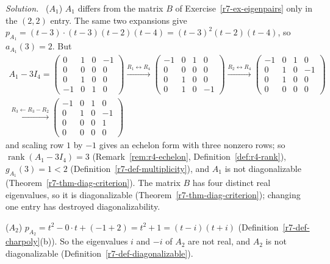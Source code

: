 \documentclass[12pt]{article}
\DeclareMathOperator{\rank}{rank}
\theoremstyle{definition}
\newenvironment{solution}{\par\noindent\textit{Solution.}\ }{\par\smallskip}
\begin{document}
\begin{solution}
(\(A_1\)) \(A_1\) differs from the matrix \(B\) of Exercise~\ref{r7-ex-eigenpairs} only in the \((2,2)\) entry. The same
two expansions give \(p_{A_1}=(t-3)\cdot(t-3)(t-2)(t-4)=(t-3)^2(t-2)(t-4)\), so \(a_{A_1}(3)=2\). But
\[
\begin{gathered}
A_1-3I_4=\begin{pmatrix}0&1&0&-1\\0&0&0&0\\0&1&0&0\\-1&0&1&0\end{pmatrix}
\xrightarrow{R_1\leftrightarrow R_4}
\begin{pmatrix}-1&0&1&0\\0&0&0&0\\0&1&0&0\\0&1&0&-1\end{pmatrix}
\xrightarrow{R_2\leftrightarrow R_4}
\begin{pmatrix}-1&0&1&0\\0&1&0&-1\\0&1&0&0\\0&0&0&0\end{pmatrix}
\\
\xrightarrow{R_3\leftarrow R_3-R_2}
\begin{pmatrix}-1&0&1&0\\0&1&0&-1\\0&0&0&1\\0&0&0&0\end{pmatrix}
\end{gathered}
\]
and scaling row \(1\) by \(-1\) gives an echelon form with three nonzero rows; so \(\rank(A_1-3I_4)=3\)
(Remark~\ref{rem:r4-echelon}, Definition~\ref{def:r4-rank}), \(g_{A_1}(3)=1<2\) (Definition~\ref{r7-def-multiplicity}),
and \(A_1\) is not diagonalizable (Theorem~\ref{r7-thm-diag-criterion}). The matrix \(B\) has four distinct real
eigenvalues, so it is diagonalizable (Theorem~\ref{r7-thm-diag-criterion}); changing one entry has destroyed
diagonalizability.

(\(A_2\)) \(p_{A_2}=t^2-0\cdot t+(-1+2)=t^2+1=(t-i)(t+i)\) (Definition~\ref{r7-def-charpoly}(b)). So the eigenvalues
\(i\) and \(-i\) of \(A_2\) are not real, and \(A_2\) is not diagonalizable (Definition~\ref{r7-def-diagonalizable}).


\end{solution}
\end{document}
